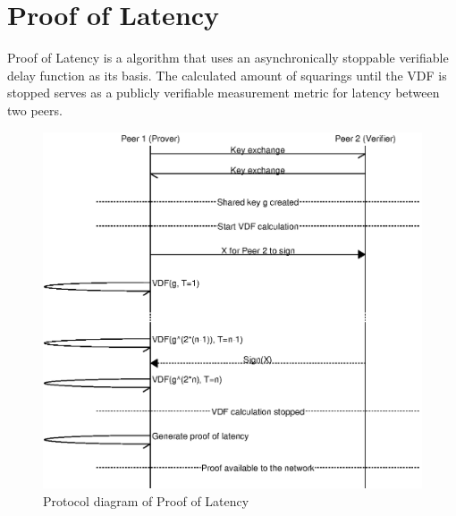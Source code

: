 \chapter{Proof of Latency}
\label{Proof of Latency}

Proof of Latency is a algorithm that uses an asynchronically stoppable verifiable delay function as its basis. The calculated amount of squarings until the VDF is stopped serves as a publicly verifiable measurement metric for latency between two peers.
\begin{figure}
  \includegraphics[width=\textwidth]{pictures/pol_diagram.eps}
\caption{Protocol diagram of Proof of Latency}
\label{Diagram 1}
\end{figure}
